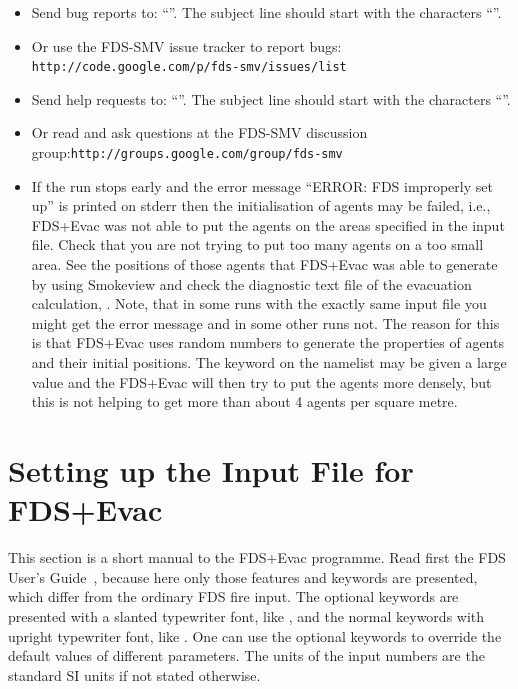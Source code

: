 \documentclass[12pt,a4paper,final,twoside]{stylevk}
\begin{document}
%
\begin{itemize}
\item Send bug reports to: ``''.  The
  subject line should start with the characters ``''.
%
\item Or use the FDS-SMV issue tracker to report bugs:\newline
  \texttt{http://code.google.com/p/fds-smv/issues/list} 
%
\item Send help requests to: ``''.  The
  subject line should start with the characters ``''.
%
\item Or read and ask questions at the FDS-SMV discussion
  group:\newline \texttt{http://groups.google.com/group/fds-smv}
%
\item If the run stops early and the error message ``ERROR: FDS
  improperly set up'' is printed on stderr then the initialisation of
  agents may be failed, i.e., FDS+Evac was not able to put the
  agents on the areas specified in the input file.  Check that you are
  not trying to put too many agents on a too small area.  See the
  positions of those agents that FDS+Evac was able to generate by
  using Smokeview and check the diagnostic text file of the evacuation
  calculation, .  Note, that in some runs with
  the exactly same input file you might get the error message and in
  some other runs not.  The reason for this is that FDS+Evac uses
  random numbers to generate the properties of agents and their
  initial positions.  The keyword  on the
   namelist may be given a large value and the FDS+Evac
  will then try to put the agents more densely, but this is not
  helping to get more than about 4 agents per square metre.
%
\end{itemize}

\clearpage

\newpage


\chapter{Setting up the Input File for
  FDS+Evac}\label{Sec_EvacInputFile}  

\noindent This section is a short manual to the FDS+Evac programme.
Read first the FDS User's Guide~\cite{FDS_UserGuide}, because here
only those features and keywords are presented, which differ from the
ordinary FDS fire input.  The optional keywords are presented with a
slanted typewriter font, like , and the normal keywords
with upright typewriter font, like .  One can use the
optional keywords to override the default values of different
parameters.  The units of the input numbers are the standard SI units
if not stated otherwise.
\end{document}
